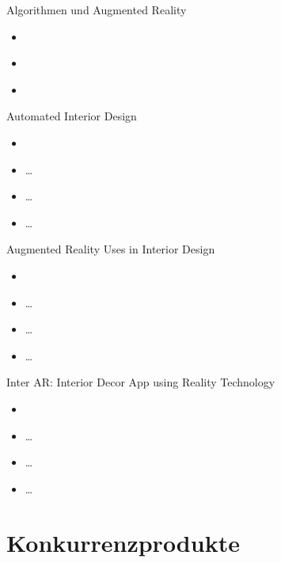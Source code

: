 \documentclass[presentation,bigger,aspectratio=169]{beamer}
\begin{document}
\begin{frame}[label={sec:orge0edf5f}]{Algorithmen und Augmented Reality}
\begin{itemize}
\item \textcite{kanAutomatedInteriorDesign2017}
\item \textcite{sanduAugmentedRealityUses2018}
\item \textcite{moaresInterARInterior2020}
\end{itemize}
\end{frame}

\begin{frame}[label={sec:orga4a48fd}]{Automated Interior Design}
\begin{itemize}
\item \textcite{kanAutomatedInteriorDesign2017}
\item \ldots{}
\item \ldots{}
\item \ldots{}
\end{itemize}
\end{frame}

\begin{frame}[label={sec:orgd796f3d}]{Augmented Reality Uses in Interior Design}
\begin{itemize}
\item \textcite{sanduAugmentedRealityUses2018}
\item \ldots{}
\item \ldots{}
\item \ldots{}
\end{itemize}
\end{frame}

\begin{frame}[label={sec:org77583ee}]{Inter AR: Interior Decor App using Reality Technology}
\begin{itemize}
\item \textcite{moaresInterARInterior2020}
\item \ldots{}
\item \ldots{}
\item \ldots{}
\end{itemize}
\end{frame}
\section{Konkurrenzprodukte}
\label{sec:org2782fc1}
\begin{frame}[label={sec:org03fb407}]{\vspace{2.2cm}\begin{center}\MakeUppercase{\insertsection}\end{center}}
\end{frame}
\end{document}
